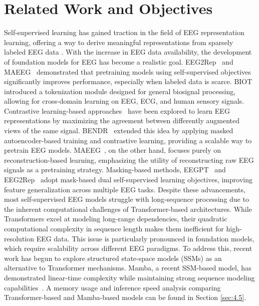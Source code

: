 \section{Related Work and Objectives }
Self-supervised learning has gained traction in the field of EEG representation learning, offering a way to derive meaningful representations from sparsely labeled EEG data \cite{deng2022boosting}. With the increase in EEG data availability, the development of foundation models for EEG has become a realistic goal. EEG2Rep~\cite{eeg2rep2024} and MAEEG~\cite{chien2211maeeg} demonstrated that pretraining models using self-supervised objectives significantly improves performance, especially when labeled data is scarce. BIOT~\cite{yang2024biot} introduced a tokenization module designed for general biosignal processing, allowing for cross-domain learning on EEG, ECG, and human sensory signals. Contrastive learning-based approaches~\cite{mohsenvand2020contrastive} have been explored to learn EEG representations by maximizing the agreement between differently augmented views of the same signal. BENDR~\cite{kostas2021bendr} extended this idea by applying masked autoencoder-based training and contrastive learning, providing a scalable way to pretrain EEG models. MAEEG~\cite{chien2211maeeg}, on the other hand, focuses purely on reconstruction-based learning, emphasizing the utility of reconstructing raw EEG signals as a pretraining strategy. Masking-based methods, EEGPT~\cite{wangeegpt} and EEG2Rep~\cite{eeg2rep2024} adopt mask-based dual self-supervised learning objectives, improving feature generalization across multiple EEG tasks.  Despite these advancements, most self-supervised EEG models struggle with long-sequence processing due to the inherent computational challenges of Transformer-based architectures. While Transformers excel at modeling long-range dependencies, their quadratic computational complexity in sequence length makes them inefficient for high-resolution EEG data. This issue is particularly pronounced in foundation models, which require scalability across different EEG paradigms. To address this, recent work has begun to explore structured state-space models (SSMs) as an alternative to Transformer mechanisms. Mamba, a recent SSM-based model, has demonstrated linear-time complexity while maintaining strong sequence modeling capabilities~\cite{gu2023mamba}. A memory usage and inference speed analysis comparing Transformer-based and Mamba-based models can be found in Section \ref{sec:4.5}.


